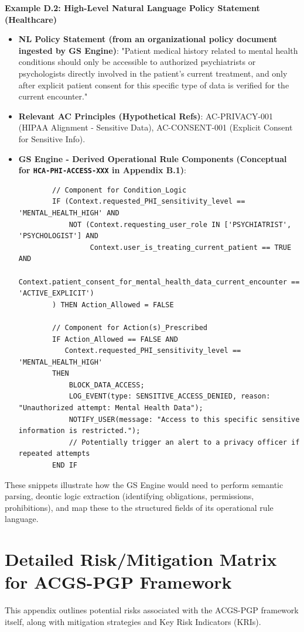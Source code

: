 \documentclass[sigconf,review,anonymous=false]{acmart} %
\begin{document}
\textbf{Example D.2: High-Level Natural Language Policy Statement (Healthcare)}
\begin{itemize}
    \item \textbf{NL Policy Statement (from an organizational policy document ingested by GS Engine)}: "Patient medical history related to mental health conditions should only be accessible to authorized psychiatrists or psychologists directly involved in the patient's current treatment, and only after explicit patient consent for this specific type of data is verified for the current encounter."
    \item \textbf{Relevant AC Principles (Hypothetical Refs)}: AC-PRIVACY-001 (HIPAA Alignment - Sensitive Data), AC-CONSENT-001 (Explicit Consent for Sensitive Info).
    \item \textbf{GS Engine - Derived Operational Rule Components (Conceptual for \texttt{HCA-PHI-ACCESS-XXX} in Appendix B.1)}:
        \begin{verbatim}
        // Component for Condition_Logic
        IF (Context.requested_PHI_sensitivity_level == 'MENTAL_HEALTH_HIGH' AND
            NOT (Context.requesting_user_role IN ['PSYCHIATRIST', 'PSYCHOLOGIST'] AND
                 Context.user_is_treating_current_patient == TRUE AND
                 Context.patient_consent_for_mental_health_data_current_encounter == 'ACTIVE_EXPLICIT')
        ) THEN Action_Allowed = FALSE

        // Component for Action(s)_Prescribed
        IF Action_Allowed == FALSE AND
           Context.requested_PHI_sensitivity_level == 'MENTAL_HEALTH_HIGH'
        THEN
            BLOCK_DATA_ACCESS;
            LOG_EVENT(type: SENSITIVE_ACCESS_DENIED, reason: "Unauthorized attempt: Mental Health Data");
            NOTIFY_USER(message: "Access to this specific sensitive information is restricted.");
            // Potentially trigger an alert to a privacy officer if repeated attempts
        END IF
        \end{verbatim}
\end{itemize}
These snippets illustrate how the GS Engine would need to perform semantic parsing, deontic logic extraction (identifying obligations, permissions, prohibitions), and map these to the structured fields of its operational rule language.

\section{Detailed Risk/Mitigation Matrix for ACGS-PGP Framework}
\label{app:risk_matrix}
This appendix outlines potential risks associated with the ACGS-PGP framework itself, along with mitigation strategies and Key Risk Indicators (KRIs).
\end{document}
